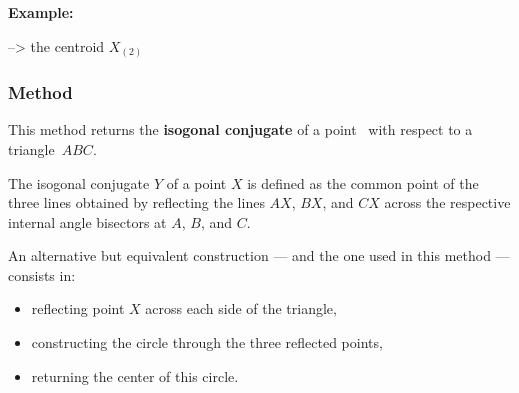 \noindent
\textbf{Example:}
\begin{mybox}
 \quad --> the centroid $X_{(2)}$
\end{mybox}

\vspace{1em}

\begin{tkzexample}[latex=.5\textwidth]
\begin{center}
\end{center}
\end{tkzexample}

\subsubsection{Method } %
\label{ssub:method_triangle_isogonal}

This method returns the \textbf{isogonal conjugate} of a point~ with respect to a triangle~$ABC$.

\medskip
\noindent
The isogonal conjugate $Y$ of a point $X$ is defined as the common point of the three lines obtained by reflecting the lines $AX$, $BX$, and $CX$ across the respective internal angle bisectors at $A$, $B$, and $C$.

\medskip
\noindent
An alternative but equivalent construction — and the one used in this method — consists in:
\begin{itemize}
  \item reflecting point $X$ across each side of the triangle,
  \item constructing the circle through the three reflected points,
  \item returning the center of this circle.
\end{itemize}

